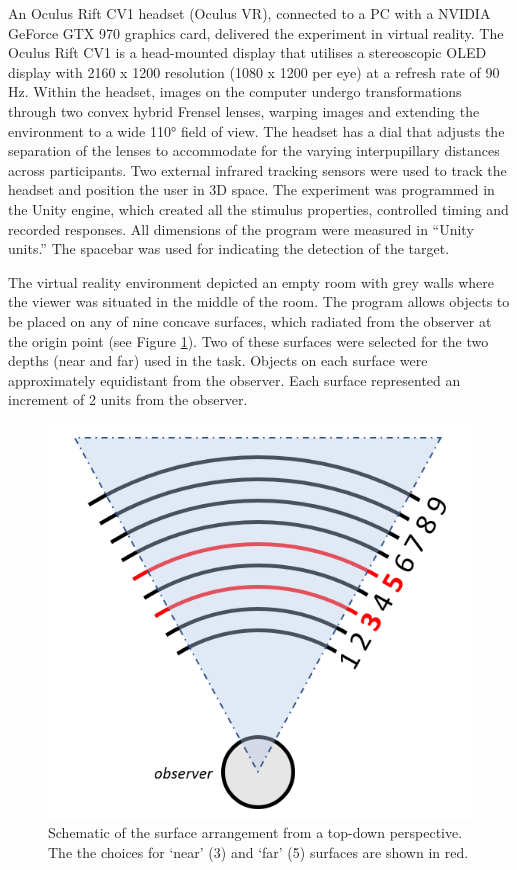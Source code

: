\documentclass[
  english,
  man,floatsintext]{apa7}
\begin{document}
An Oculus Rift CV1 headset (Oculus VR), connected to a PC with a NVIDIA GeForce GTX 970 graphics card, delivered the experiment in virtual reality. The Oculus Rift CV1 is a head-mounted display that utilises a stereoscopic OLED display with 2160 x 1200 resolution (1080 x 1200 per eye) at a refresh rate of 90 Hz. Within the headset, images on the computer undergo transformations through two convex hybrid Frensel lenses, warping images and extending the environment to a wide 110° field of view. The headset has a dial that adjusts the separation of the lenses to accommodate for the varying interpupillary distances across participants. Two external infrared tracking sensors were used to track the headset and position the user in 3D space. The experiment was programmed in the Unity engine, which created all the stimulus properties, controlled timing and recorded responses. All dimensions of the program were measured in ``Unity units.'' The spacebar was used for indicating the detection of the target.

The virtual reality environment depicted an empty room with grey walls where the viewer was situated in the middle of the room. The program allows objects to be placed on any of nine concave surfaces, which radiated from the observer at the origin point (see Figure \ref{fig:schematic}). Two of these surfaces were selected for the two depths (near and far) used in the task. Objects on each surface were approximately equidistant from the observer. Each surface represented an increment of 2 units from the observer.



\begin{figure}

{\centering \includegraphics[width=0.6\linewidth]{VR_schematic} 

}

\caption{Schematic of the surface arrangement from a top-down perspective. The the choices for `near' (3) and `far' (5) surfaces are shown in red.}\label{fig:schematic}
\end{figure}
\end{document}

